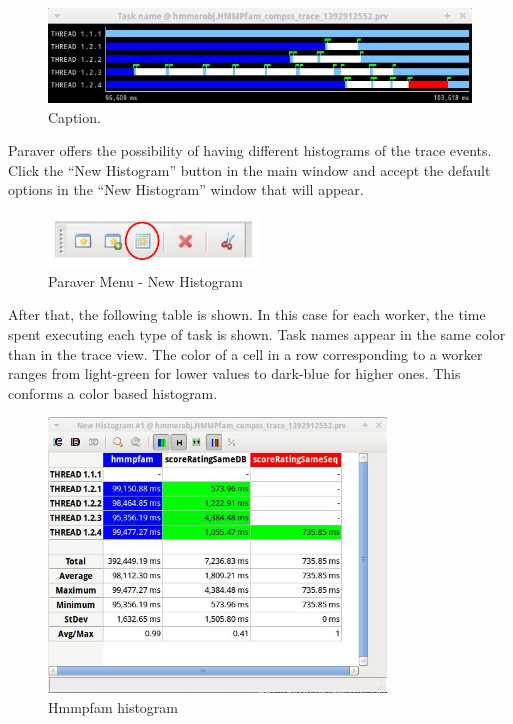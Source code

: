 \begin{figure}[ht!]
  \centering
    \includegraphics[width=1.0\textwidth]{./Sections/5_Analysis/Figures/11.jpeg}
    \caption{Caption.}
\end{figure} 
 
Paraver offers the possibility of having different histograms of the trace events. 
Click the ``New Histogram'' button in the main window and accept the 
default options in the ``New Histogram'' window that will appear.

\begin{figure}[ht!]
  \centering
    \includegraphics[width=0.5\textwidth]{./Sections/5_Analysis/Figures/12.jpeg}
    \caption{Paraver Menu - New Histogram}
\end{figure}

After that, the following table is shown. In this case for each worker, the time spent 
executing each type of task is shown. Task names appear in the same color than in the 
trace view. The color of a cell in a row corresponding to a worker ranges from 
light-green for lower values to dark-blue for higher ones. This conforms a color based histogram.

\begin{figure}[ht!]
  \centering
    \includegraphics[width=0.8\textwidth]{./Sections/5_Analysis/Figures/13.jpeg}
    \caption{Hmmpfam histogram}
\end{figure}
 
